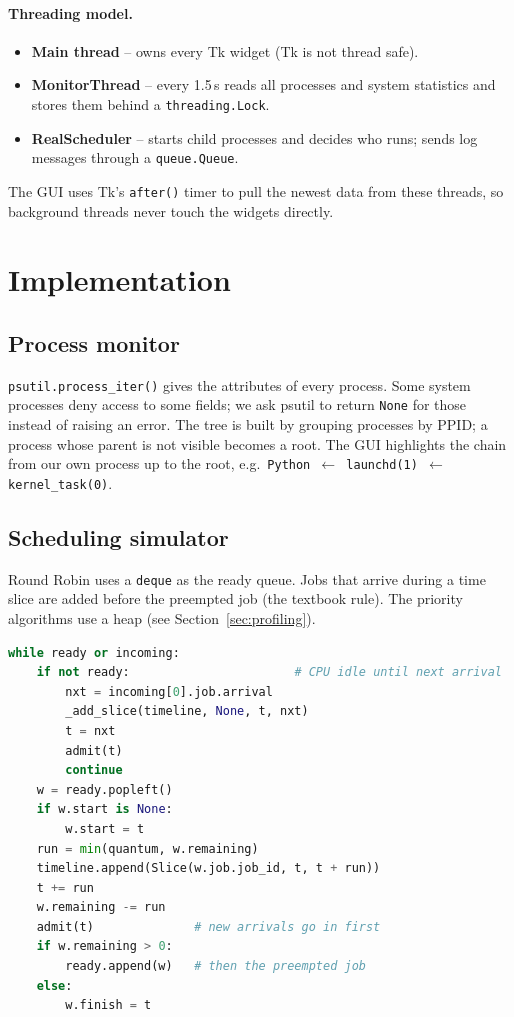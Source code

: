 \documentclass[11pt,a4paper]{article}
\begin{document}
\paragraph{Threading model.}
\begin{itemize}
  \item \textbf{Main thread} -- owns every Tk widget (Tk is not thread safe).
  \item \textbf{MonitorThread} -- every 1.5\,s reads all processes and system statistics and stores
        them behind a \texttt{threading.Lock}.
  \item \textbf{RealScheduler} -- starts child processes and decides who runs; sends log messages
        through a \texttt{queue.Queue}.
\end{itemize}
The GUI uses Tk's \texttt{after()} timer to pull the newest data from these threads, so
background threads never touch the widgets directly.

\section{Implementation}

\subsection{Process monitor}
\texttt{psutil.process\_iter()} gives the attributes of every process. Some system processes
deny access to some fields; we ask psutil to return \texttt{None} for those instead of
raising an error. The tree is built by grouping processes by PPID; a process whose parent
is not visible becomes a root. The GUI highlights the chain from our own process up to the
root, e.g.\ \texttt{Python $\leftarrow$ launchd(1) $\leftarrow$ kernel\_task(0)}.

\subsection{Scheduling simulator}
Round Robin uses a \texttt{deque} as the ready queue. Jobs that arrive during a time slice
are added before the preempted job (the textbook rule). The priority algorithms use a heap
(see Section~\ref{sec:profiling}).

\begin{lstlisting}[language=Python, caption={Core of Round Robin (scheduler.py)}]
while ready or incoming:
    if not ready:                       # CPU idle until next arrival
        nxt = incoming[0].job.arrival
        _add_slice(timeline, None, t, nxt)
        t = nxt
        admit(t)
        continue
    w = ready.popleft()
    if w.start is None:
        w.start = t
    run = min(quantum, w.remaining)
    timeline.append(Slice(w.job.job_id, t, t + run))
    t += run
    w.remaining -= run
    admit(t)              # new arrivals go in first
    if w.remaining > 0:
        ready.append(w)   # then the preempted job
    else:
        w.finish = t
\end{lstlisting}
\end{document}

